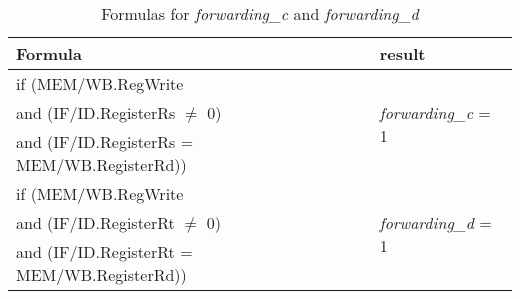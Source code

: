 \begin{table}[h]
    \centering\begin{tabular}{ l l }
        Formula & result \\
        \hline
        if (MEM/WB.RegWrite & \multirow{3}{2cm}{\emph{forwarding\_c} = 1}\\
        and (IF/ID.RegisterRs $\neq$ 0) & \\
        and (IF/ID.RegisterRs = MEM/WB.RegisterRd)) & \\ 
        \hline
        if (MEM/WB.RegWrite & \multirow{3}{2cm}{\emph{forwarding\_d} = 1}\\
        and (IF/ID.RegisterRt $\neq$ 0) & \\
        and (IF/ID.RegisterRt = MEM/WB.RegisterRd)) & \\
        \hline
    \end{tabular}
    \caption{Formulas for \emph{forwarding\_c} and \emph{forwarding\_d}}
    \label{table:forwarding_c_d}
\end{table}